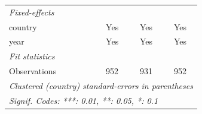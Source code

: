 \begin{table}[htbp]
\begin{tabular}{lccc}
      \emph{Fixed-effects}\\
      country              & Yes                & Yes                      & Yes\\  
      year                 & Yes                & Yes                      & Yes\\  
      \midrule
      \emph{Fit statistics}\\
      Observations         & 952                & 931                      & 952\\  
      \midrule \midrule
      \multicolumn{4}{l}{\emph{Clustered (country) standard-errors in parentheses}}\\
      \multicolumn{4}{l}{\emph{Signif. Codes: ***: 0.01, **: 0.05, *: 0.1}}\\
   \end{tabular}
\end{table}
